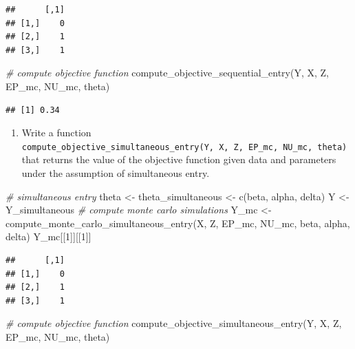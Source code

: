 \documentclass[
]{book}
\newenvironment{Shaded}{\begin{snugshade}}{\end{snugshade}}
\newcommand{\CommentTok}[1]{\textcolor[rgb]{0.56,0.35,0.01}{\textit{#1}}}
\newcommand{\DecValTok}[1]{\textcolor[rgb]{0.00,0.00,0.81}{#1}}
\newcommand{\FunctionTok}[1]{\textcolor[rgb]{0.00,0.00,0.00}{#1}}
\newcommand{\NormalTok}[1]{#1}
\newcommand{\OtherTok}[1]{\textcolor[rgb]{0.56,0.35,0.01}{#1}}
\providecommand{\tightlist}{%
  \setlength{\itemsep}{0pt}\setlength{\parskip}{0pt}}
\begin{document}
\begin{verbatim}
##      [,1]
## [1,]    0
## [2,]    1
## [3,]    1
\end{verbatim}

\begin{Shaded}
\begin{Highlighting}[]
\CommentTok{\# compute objective function}
\FunctionTok{compute\_objective\_sequential\_entry}\NormalTok{(Y, X, Z, EP\_mc, NU\_mc, theta)}
\end{Highlighting}
\end{Shaded}

\begin{verbatim}
## [1] 0.34
\end{verbatim}

\begin{enumerate}
\def\labelenumi{\arabic{enumi}.}
\setcounter{enumi}{2}
\tightlist
\item
  Write a function \texttt{compute\_objective\_simultaneous\_entry(Y,\ X,\ Z,\ EP\_mc,\ NU\_mc,\ theta)} that returns the value of the objective function given data and parameters under the assumption of simultaneous entry.
\end{enumerate}

\begin{Shaded}
\begin{Highlighting}[]
\CommentTok{\# simultaneous entry}
\NormalTok{theta }\OtherTok{\textless{}{-}}\NormalTok{ theta\_simultaneous }\OtherTok{\textless{}{-}}
  \FunctionTok{c}\NormalTok{(beta, alpha, delta)}
\NormalTok{Y }\OtherTok{\textless{}{-}}\NormalTok{ Y\_simultaneous}
\CommentTok{\# compute monte carlo simulations}
\NormalTok{Y\_mc }\OtherTok{\textless{}{-}} \FunctionTok{compute\_monte\_carlo\_simultaneous\_entry}\NormalTok{(X, Z, EP\_mc, NU\_mc, beta, alpha, delta)}
\NormalTok{Y\_mc[[}\DecValTok{1}\NormalTok{]][[}\DecValTok{1}\NormalTok{]]}
\end{Highlighting}
\end{Shaded}

\begin{verbatim}
##      [,1]
## [1,]    0
## [2,]    1
## [3,]    1
\end{verbatim}

\begin{Shaded}
\begin{Highlighting}[]
\CommentTok{\# compute objective function}
\FunctionTok{compute\_objective\_simultaneous\_entry}\NormalTok{(Y, X, Z, EP\_mc, NU\_mc, theta)}
\end{Highlighting}
\end{Shaded}
\end{document}
